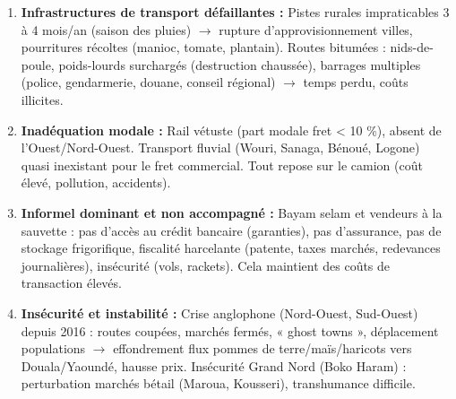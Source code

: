 \documentclass[11pt]{article}
\begin{document}
\begin{aretenir}
\begin{enumerate}
\item \textbf{Infrastructures de transport défaillantes :} Pistes rurales impraticables 3 à 4 mois/an (saison des pluies) $\rightarrow$ rupture d'approvisionnement villes, pourritures récoltes (manioc, tomate, plantain). Routes bitumées : nids-de-poule, poids-lourds surchargés (destruction chaussée), barrages multiples (police, gendarmerie, douane, conseil régional) $\rightarrow$ temps perdu, coûts illicites.
\item \textbf{Inadéquation modale :} Rail vétuste (part modale fret < 10 \%), absent de l'Ouest/Nord-Ouest. Transport fluvial (Wouri, Sanaga, Bénoué, Logone) quasi inexistant pour le fret commercial. Tout repose sur le camion (coût élevé, pollution, accidents).
\item \textbf{Informel dominant et non accompagné :} Bayam selam et vendeurs à la sauvette : pas d'accès au crédit bancaire (garanties), pas d'assurance, pas de stockage frigorifique, fiscalité harcelante (patente, taxes marchés, redevances journalières), insécurité (vols, rackets). Cela maintient des coûts de transaction élevés.
\item \textbf{Insécurité et instabilité :} Crise anglophone (Nord-Ouest, Sud-Ouest) depuis 2016 : routes coupées, marchés fermés, « ghost towns », déplacement populations $\rightarrow$ effondrement flux pommes de terre/maïs/haricots vers Douala/Yaoundé, hausse prix. Insécurité Grand Nord (Boko Haram) : perturbation marchés bétail (Maroua, Kousseri), transhumance difficile.
\end{enumerate}
\end{aretenir}
\end{document}
